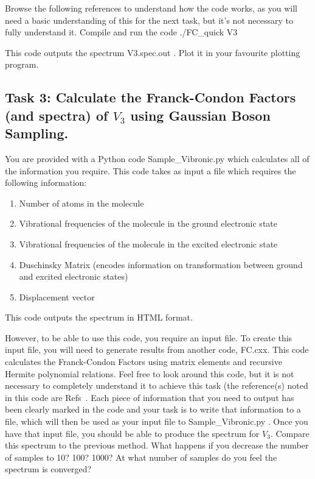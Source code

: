\documentclass[12pt]{article}
\begin{document}
\noindent Browse the following references to understand how the code works, as you will need a basic understanding of this for the next task, but it's not necessary to fully understand it. Compile and run the code ./FC\_quick V3

\noindent This code outputs the spectrum V3.spec.out . Plot it in your favourite plotting program. 


\subsection{Task 3: Calculate the Franck-Condon Factors (and spectra) of $V_3$ using Gaussian Boson Sampling.}

You are provided with a Python code Sample\_Vibronic.py which calculates all of the information you require.
\noindent This code takes as input a file which requires the following information:
\begin{enumerate}
    \item Number of atoms in the molecule
    \item Vibrational frequencies of the molecule in the ground electronic state
    \item Vibrational frequencies of the molecule in the excited electronic state
    \item Duschinsky Matrix (encodes information on transformation between ground and excited electronic states)
    \item Displacement vector
\end{enumerate}

\noindent This code outputs the spectrum in HTML format.

However, to be able to use this code, you require an input file. To create this input file, you will need to generate results from another code, FC.cxx. This code calculates the Franck-Condon Factors using matrix elements and recursive Hermite polynomial relations. Feel free to look around this code, but it is not necessary to completely understand it to achieve this task (the reference(s) noted in this code are Refs~\cite{doktorov1977dynamical,yang1995structure,quesadaFranckCondonFactorsCounting2019}. Each piece of information that you need to output has been clearly marked in the code and your task is to write that information to a file, which will then be used as your input file to Sample\_Vibronic.py  . Once you have that input file, you should be able to produce the spectrum for $V_3$. Compare this spectrum to the previous method. What happens if you decrease the number of samples to 10? 100? 1000? At what number of samples do you feel the spectrum is converged?
\end{document}
